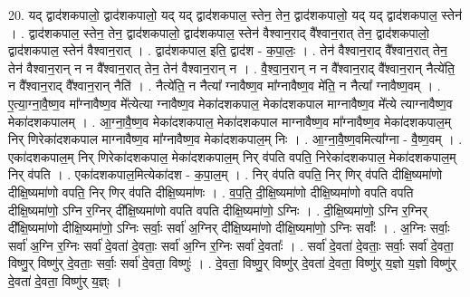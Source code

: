 \documentclass[17pt]{extarticle}
\begin{document}
20. यद् द्वाद॑शकपालो॒ द्वाद॑शकपालो॒ यद् यद् द्वाद॑शकपाल॒ स्तेन॒ तेन॒ द्वाद॑शकपालो॒ यद् यद् द्वाद॑शकपाल॒ स्तेन॑ । . द्वाद॑शकपाल॒ स्तेन॒ तेन॒ द्वाद॑शकपालो॒ द्वाद॑शकपाल॒ स्तेन॑ वैश्वान॒राद् वै᳚श्वान॒रात् तेन॒ द्वाद॑शकपालो॒ द्वाद॑शकपाल॒ स्तेन॑ वैश्वान॒रात् । . द्वाद॑शकपाल॒ इति॒ द्वाद॑श - क॒पा॒लः॒ । . तेन॑ वैश्वान॒राद् वै᳚श्वान॒रात् तेन॒ तेन॑ वैश्वान॒रान् न न वै᳚श्वान॒रात् तेन॒ तेन॑ वैश्वान॒रान् न । . वै॒श्वा॒न॒रान् न न वै᳚श्वान॒राद् वै᳚श्वान॒रान् नैत्ये॑ति॒ न वै᳚श्वान॒राद् वै᳚श्वान॒रान् नैति॑ । . नैत्ये॑ति॒ न नैत्या᳚ ग्नावैष्ण॒व मा᳚ग्नावैष्ण॒व मे॑ति॒ न नैत्या᳚ ग्नावैष्ण॒वम् । . ए॒त्या॒ग्ना॒वै॒ष्ण॒व मा᳚ग्नावैष्ण॒व मे᳚त्येत्या ग्नावैष्ण॒व मेका॑दशकपाल॒ मेका॑दशकपाल माग्नावैष्ण॒व मे᳚त्ये त्याग्नावैष्ण॒व मेका॑दशकपालम् । . आ॒ग्ना॒वै॒ष्ण॒व मेका॑दशकपाल॒ मेका॑दशकपाल माग्नावैष्ण॒व मा᳚ग्नावैष्ण॒व मेका॑दशकपाल॒म् निर् णिरेका॑दशकपाल माग्नावैष्ण॒व मा᳚ग्नावैष्ण॒व मेका॑दशकपाल॒म् निः । . आ॒ग्ना॒वै॒ष्ण॒वमित्या᳚ग्ना - वै॒ष्ण॒वम् । . एका॑दशकपाल॒म् निर् णिरेका॑दशकपाल॒ मेका॑दशकपाल॒म् निर् व॑पति वपति॒ निरेका॑दशकपाल॒ मेका॑दशकपाल॒म् निर् व॑पति । . एका॑दशकपाल॒मित्येका॑दश - क॒पा॒ल॒म् । . निर् व॑पति वपति॒ निर् णिर् व॑पति दीक्षि॒ष्यमा॑णो दीक्षि॒ष्यमा॑णो वपति॒ निर् णिर् व॑पति दीक्षि॒ष्यमा॑णः । . व॒प॒ति॒ दी॒क्षि॒ष्यमा॑णो दीक्षि॒ष्यमा॑णो वपति वपति दीक्षि॒ष्यमा॑णो॒ ऽग्नि र॒ग्निर् दी᳚क्षि॒ष्यमा॑णो वपति वपति दीक्षि॒ष्यमा॑णो॒ ऽग्निः । . दी॒क्षि॒ष्यमा॑णो॒ ऽग्नि र॒ग्निर् दी᳚क्षि॒ष्यमा॑णो दीक्षि॒ष्यमा॑णो॒ ऽग्निः सर्वाः॒ सर्वा॑ अ॒ग्निर् दी᳚क्षि॒ष्यमा॑णो दीक्षि॒ष्यमा॑णो॒ ऽग्निः सर्वाः᳚ । . अ॒ग्निः सर्वाः॒ सर्वा॑ अ॒ग्नि र॒ग्निः सर्वा॑ दे॒वता॑ दे॒वताः॒ सर्वा॑ अ॒ग्नि र॒ग्निः सर्वा॑ दे॒वताः᳚ । . सर्वा॑ दे॒वता॑ दे॒वताः॒ सर्वाः॒ सर्वा॑ दे॒वता॒ विष्णु॒र् विष्णु॑र् दे॒वताः॒ सर्वाः॒ सर्वा॑ दे॒वता॒ विष्णुः॑ । . दे॒वता॒ विष्णु॒र् विष्णु॑र् दे॒वता॑ दे॒वता॒ विष्णु॑र् य॒ज्ञो य॒ज्ञो विष्णु॑र् दे॒वता॑ दे॒वता॒ विष्णु॑र् य॒ज्ञ्ः । \newline
\end{document}
